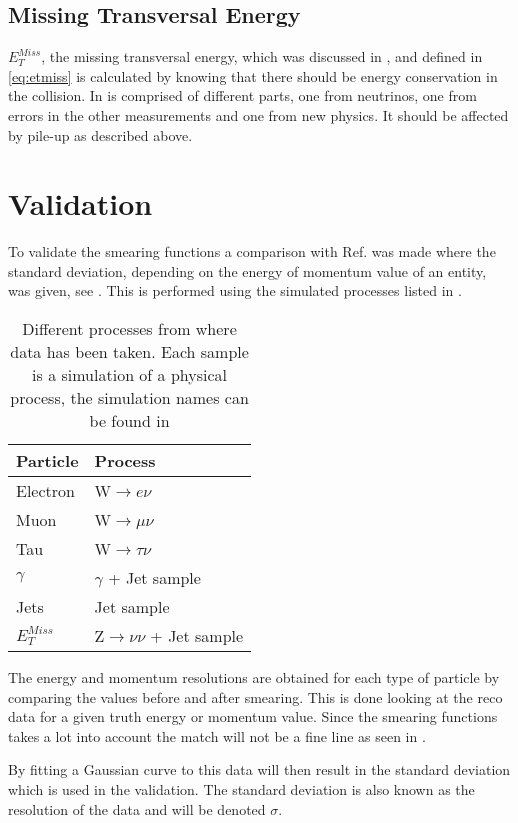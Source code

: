 \subsection{Missing Transversal Energy}
$E_T^{Miss}$, the missing transversal energy, which was discussed in , and defined in \eqref{eq:etmiss} is calculated by knowing that there should be energy conservation in the collision. In is comprised of different parts, one from neutrinos, one from errors in the other measurements and one from new physics. It should be affected by pile-up as described above.

\newpage
\section{Validation}\label{sec:vali}
To validate the smearing functions a comparison with Ref. \citep{ATL-PHYS-PUB-2013-004} was made where the standard deviation, depending on the energy of momentum value of an entity, was given, see . This is performed using the simulated processes listed in . 
\begin{SCtable}[][ht]
\begin{tabular}{|l|l|}
\hline
Particle & Process \\ \hline
Electron & W$\rightarrow e\nu$ \\
Muon & W$\rightarrow \mu \nu$ \\
Tau & W$\rightarrow \tau \nu$ \\
$\gamma$ & $\gamma$ + Jet sample \\
Jets & Jet sample \\
$E_T^{Miss}$ & Z$\rightarrow \nu \nu$ + Jet sample \\ \hline
\end{tabular}
\caption{Different processes from where data has been taken. Each sample is a simulation of a physical process, the simulation names can be found in }
\label{tab:backproc}
\end{SCtable}

The energy and momentum resolutions are obtained for each type of particle by comparing the values before and after smearing.
This is done looking at the reco data for a given truth energy or momentum value. Since the smearing functions takes a lot into account the match will not be a fine line as seen in .

By fitting a Gaussian curve to this data will then result in the standard deviation which is used in the validation. The standard deviation is also known as the resolution of the data and will be denoted $\sigma$.


